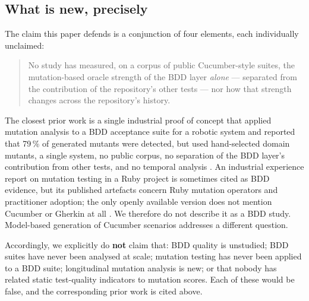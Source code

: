 \subsection{What is new, precisely}

The claim this paper defends is a conjunction of four elements, each individually unclaimed:

\begin{quote}
No study has measured, on a corpus of public Cucumber-style suites, the mutation-based oracle strength
of the BDD layer \emph{alone} --- separated from the contribution of the repository's other tests ---
nor how that strength changes across the repository's history.
\end{quote}

The closest prior work is a single industrial proof of concept that applied mutation analysis to a BDD
acceptance suite for a robotic system and reported that 79\,\% of generated mutants were detected, but
used hand-selected domain mutants, a single system, no public corpus, no separation of the BDD layer's
contribution from other tests, and no temporal analysis \citep{santos2024aat4irs}. An industrial
experience report on mutation testing in a Ruby project is sometimes cited as BDD evidence, but its
published artefacts concern Ruby mutation operators and practitioner adoption; the only openly
available version does not mention Cucumber or Gherkin at all \citep{li2015mutationpracticeruby}. We
therefore do not describe it as a BDD study. Model-based generation of Cucumber scenarios
\citep{li2016skyfire} addresses a different question.

Accordingly, we explicitly do \textbf{not} claim that: BDD quality is unstudied; BDD suites have never
been analysed at scale; mutation testing has never been applied to a BDD suite; longitudinal mutation
analysis is new; or that nobody has related static test-quality indicators to mutation scores. Each of
these would be false, and the corresponding prior work is cited above.
